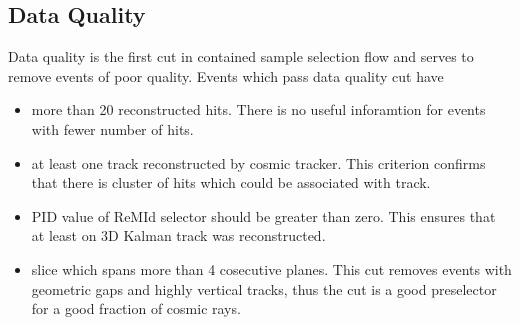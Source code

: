 \subsection{Data Quality}
Data quality is the first cut in contained sample selection flow and serves to remove
events of poor quality. Events which pass data quality cut have
\begin{itemize}
\item more than 20 reconstructed hits. There is no useful inforamtion for events with fewer 
number of hits.
\item at least one track reconstructed by cosmic tracker. This criterion confirms that there is
cluster of hits which could be associated with track.
\item PID value of ReMId selector should be greater than zero. This ensures that at least on 
3D Kalman track was reconstructed.
\item slice which spans more than 4 cosecutive planes. This cut removes events with geometric 
gaps and highly vertical tracks, thus the cut is a good preselector for a good fraction of 
cosmic rays.
\end{itemize}

